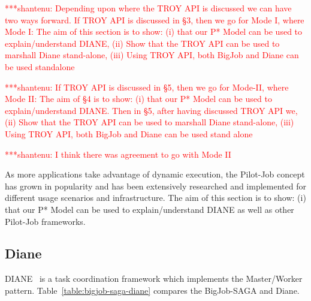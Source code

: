 \documentclass[conference,final]{IEEEtran}
\newcommand{\jhanote}[1]{ {\textcolor{red} { ***shantenu: #1 }}}
\newcommand{\jhanote}[1]{}
\begin{document}
\jhanote{Depending upon where the TROY API is discussed we can have
  two ways forward. If TROY API is discussed in \S 3, then we go for
  Mode I, where Mode I: The aim of this section is to show: (i) that
  our P* Model can be used to explain/understand DIANE, (ii) Show that
  the TROY API can be used to marshall Diane stand-alone, (iii) Using
  TROY API, both BigJob and Diane can be used standalone}

\jhanote{If TROY API is discussed in \S 5, then we go for Mode-II,
  where Mode II: The aim of \S 4 is to show: (i) that our P* Model can
  be used to explain/understand DIANE.  Then in \S 5, after having
  discussed TROY API we, (ii) Show that the TROY API can be used to
  marshall Diane stand-alone, (iii) Using TROY API, both BigJob and
  Diane can be used stand alone}

\jhanote{I think there was agreement to go with Mode II}

As more applications take advantage of dynamic execution, the Pilot-Job concept
has grown in popularity and has been extensively researched and implemented for
different usage scenarios and infrastructure. The aim of this section is to
show: (i) that our P* Model can be used to explain/understand DIANE as well as
other Pilot-Job frameworks.

\subsection{Diane}

DIANE~\cite{Moscicki:908910} is a task coordination framework which
implements the Master/Worker pattern. Table~\ref{table:bigjob-saga-diane} 
compares the BigJob-SAGA and Diane. 
\end{document}
